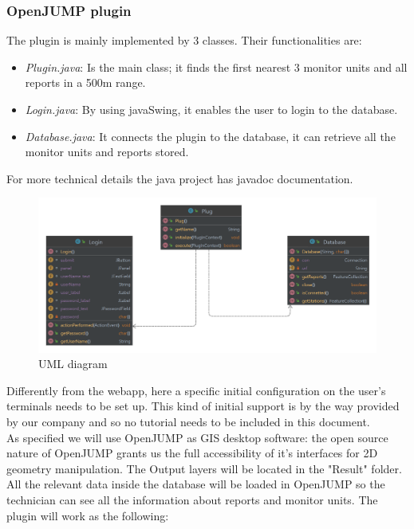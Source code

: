\subsubsection{OpenJUMP plugin}
The plugin is mainly implemented by 3 classes. Their functionalities are:

\begin{itemize}
    \item \textit{Plugin.java}: Is the main class; it finds the first nearest 3 monitor units and all reports in a 500m range.
    \item \textit{Login.java}: By using javaSwing, it enables the user to login to the database.
    \item \textit{Database.java}: It connects the plugin to the database, it can retrieve all the monitor units and reports stored.
\end{itemize}
For more technical details the java project has javadoc documentation.

\begin{figure}[H]
    \centering
    \includegraphics[width=\textwidth]{img/classdiagram.png}
    \caption{UML diagram}
    \label{uml}
\end{figure}
Differently from the webapp, here a specific initial configuration on the user's terminals needs to be set up.
This kind of initial support is by the way provided by our company and so no tutorial needs to be included in this document. \\
As specified we will use OpenJUMP as GIS desktop software: the open source nature of OpenJUMP grants us the full accessibility of it's interfaces for 2D geometry manipulation.
The Output layers will be located in the "Result" folder. All the relevant data inside the database will be loaded in OpenJUMP so the technician can see all the information about reports and monitor units.
The plugin will work as the following:

